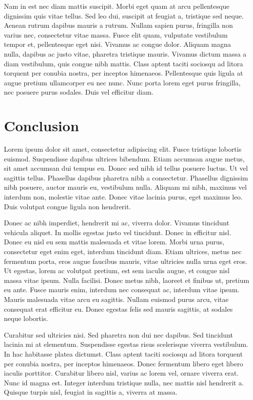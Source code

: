 \documentclass[conference]{IEEEtran}
\begin{document}
Nam in est nec diam mattis suscipit. Morbi eget quam at arcu pellentesque dignissim quis vitae tellus. Sed leo dui, suscipit at feugiat a, tristique sed neque. Aenean rutrum dapibus mauris a rutrum. Nullam sapien purus, fringilla non varius nec, consectetur vitae massa. Fusce elit quam, vulputate vestibulum tempor et, pellentesque eget nisi. Vivamus ac congue dolor. Aliquam magna nulla, dapibus ac justo vitae, pharetra tristique mauris. Vivamus dictum massa a diam vestibulum, quis congue nibh mattis. Class aptent taciti sociosqu ad litora torquent per conubia nostra, per inceptos himenaeos. Pellentesque quis ligula at augue pretium ullamcorper eu nec nunc. Nunc porta lorem eget purus fringilla, nec posuere purus sodales. Duis vel efficitur diam. 



\section{Conclusion}


Lorem ipsum dolor sit amet, consectetur adipiscing elit. Fusce tristique lobortis euismod. Suspendisse dapibus ultrices bibendum. Etiam accumsan augue metus, sit amet accumsan dui tempus eu. Donec sed nibh id tellus posuere luctus. Ut vel sagittis tellus. Phasellus dapibus pharetra nibh a consectetur. Phasellus dignissim nibh posuere, auctor mauris eu, vestibulum nulla. Aliquam mi nibh, maximus vel interdum non, molestie vitae ante. Donec vitae lacinia purus, eget maximus leo. Duis volutpat congue ligula non hendrerit.

Donec ac nibh imperdiet, hendrerit mi ac, viverra dolor. Vivamus tincidunt vehicula aliquet. In mollis egestas justo vel tincidunt. Donec in efficitur nisl. Donec eu nisl eu sem mattis malesuada et vitae lorem. Morbi urna purus, consectetur eget enim eget, interdum tincidunt diam. Etiam ultrices, metus nec fermentum porta, eros augue faucibus mauris, vitae ultricies nulla urna eget eros. Ut egestas, lorem ac volutpat pretium, est sem iaculis augue, et congue nisl massa vitae ipsum. Nulla facilisi. Donec metus nibh, laoreet et finibus ut, pretium eu ante. Fusce mauris enim, interdum nec consequat ac, interdum vitae ipsum. Mauris malesuada vitae arcu eu sagittis. Nullam euismod purus arcu, vitae consequat erat efficitur eu. Donec egestas felis sed mauris sagittis, at sodales neque lobortis.

Curabitur sed ultricies nisi. Sed pharetra non dui nec dapibus. Sed tincidunt lacinia mi at elementum. Suspendisse egestas risus scelerisque viverra vestibulum. In hac habitasse platea dictumst. Class aptent taciti sociosqu ad litora torquent per conubia nostra, per inceptos himenaeos. Donec fermentum libero eget libero iaculis porttitor. Curabitur libero nisl, varius ac lorem vel, ornare viverra erat. Nunc id magna est. Integer interdum tristique nulla, nec mattis nisl hendrerit a. Quisque turpis nisl, feugiat in sagittis a, viverra at massa. 
\end{document}
